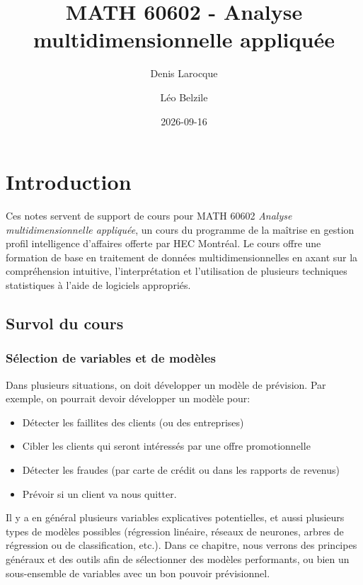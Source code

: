 \documentclass[
  11pt,
  letterpaper,
]{scrbook}
\title{MATH 60602 - Analyse multidimensionnelle appliquée}
\author{Denis Larocque \and Léo Belzile}
\date{2026-09-16}
\providecommand{\tightlist}{%
  \setlength{\itemsep}{0pt}\setlength{\parskip}{0pt}}\usepackage{longtable,booktabs,array}
\renewcommand*\contentsname{Table des matières}
\newcommand\contentsname{Table des matières}
\theoremstyle{definition}
\theoremstyle{remark}
\begin{document}


\renewcommand*\contentsname{Table des matières}
{
\setcounter{tocdepth}{2}
\tableofcontents
}

\mainmatter
{}

\chapter{Introduction}\label{introduction}

Ces notes servent de support de cours pour MATH 60602 \emph{Analyse
multidimensionnelle appliquée}, un cours du programme de la maîtrise en
gestion profil intelligence d'affaires offerte par HEC Montréal. Le
cours offre une formation de base en traitement de données
multidimensionnelles en axant sur la compréhension intuitive,
l'interprétation et l'utilisation de plusieurs techniques statistiques à
l'aide de logiciels appropriés.

\section{Survol du cours}\label{survol-du-cours}

\subsection{Sélection de variables et de
modèles}\label{suxe9lection-de-variables-et-de-moduxe8les}

Dans plusieurs situations, on doit développer un modèle de prévision.
Par exemple, on pourrait devoir développer un modèle pour:

\begin{itemize}
\tightlist
\item
  Détecter les faillites des clients (ou des entreprises)
\item
  Cibler les clients qui seront intéressés par une offre promotionnelle
\item
  Détecter les fraudes (par carte de crédit ou dans les rapports de
  revenus)
\item
  Prévoir si un client va nous quitter.
\end{itemize}

Il y a en général plusieurs variables explicatives potentielles, et
aussi plusieurs types de modèles possibles (régression linéaire, réseaux
de neurones, arbres de régression ou de classification, etc.). Dans ce
chapitre, nous verrons des principes généraux et des outils afin de
sélectionner des modèles performants, ou bien un sous-ensemble de
variables avec un bon pouvoir prévisionnel.
\end{document}
